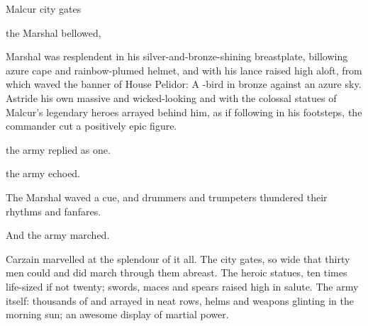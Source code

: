 \stamp
  {\dateTheArmySetsOut}
  {Malcur city gates}
%
%
%
\begin{comment}
\section{\Sethgal}
\end{comment}
 the Marshal bellowed,   

Marshal \Sethgal{} was resplendent in his silver-and-bronze-shining breastplate, billowing azure cape and rainbow-plumed helmet, and with his lance raised high aloft, from which waved the banner of House Pelidor: A \grulcan{}-bird in bronze against an azure sky. Astride his own massive and wicked-looking \grulcan{} and with the colossal statues of Malcur's legendary heroes arrayed behind him, as if following in his footsteps, the commander cut a positively epic figure. 


 the army replied as one. 


 the army echoed. 





 The Marshal waved a cue, and drummers and trumpeters thundered their rhythms and fanfares. 

And the army marched. 

\begin{comment}
\section{Carzain marvels}
\end{comment}

Carzain marvelled at the splendour of it all. The \Malcuric{} city gates, so wide that thirty men could and did march through them abreast. The heroic statues, ten times life-sized if not twenty; swords, maces and spears raised high in salute. The army itself: thousands of \scathae{} and \humans{} arrayed in neat rows, helms and weapons glinting in the morning sun; an awesome display of martial power. 

